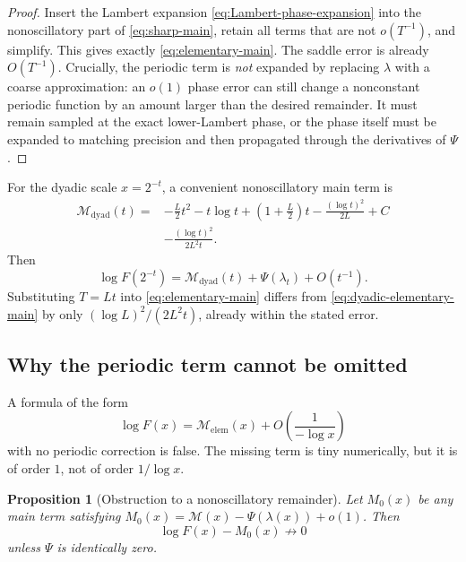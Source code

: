 \documentclass[11pt,oneside]{article}
\newtheorem{proposition}[theorem]{Proposition}
\theoremstyle{definition}
\theoremstyle{remark}
\newcommand{\Lam}{\lambda}
\newcommand{\Ltwo}{L}
\newcommand{\PsiPer}{\Psi}
\begin{document}
\begin{proof}
Insert the Lambert expansion \eqref{eq:Lambert-phase-expansion} into the
nonoscillatory part of \eqref{eq:sharp-main}, retain all terms that are not
$o(T^{-1})$, and simplify.  This gives exactly
\eqref{eq:elementary-main}.  The saddle error is already $O(T^{-1})$.
Crucially, the periodic term is \emph{not} expanded by replacing $\Lam$ with a
coarse approximation: an $o(1)$ phase error can still change a nonconstant
periodic function by an amount larger than the desired remainder.  It must remain
sampled at the exact lower-Lambert phase, or the phase itself must be expanded to
matching precision and then propagated through the derivatives of $\PsiPer$.
\end{proof}

For the dyadic scale $x=2^{-t}$, a convenient nonoscillatory main term is
\begin{equation}\label{eq:dyadic-elementary-main}
\begin{split}
 \mathcal M_{\mathrm{dyad}}(t)={}&
 -\frac{\Ltwo}{2}t^2-t\log t
 +\left(1+\frac{\Ltwo}{2}\right)t
 -\frac{(\log t)^2}{2\Ltwo}+C\\
 &-\frac{(\log t)^2}{2\Ltwo^2t}.
\end{split}
\end{equation}
Then
\begin{equation}\label{eq:dyadic-elementary-asymptotic}
  \log F(2^{-t})=\mathcal M_{\mathrm{dyad}}(t)
  +\PsiPer(\Lam_t)+O(t^{-1}).
\end{equation}
Substituting $T=\Ltwo t$ into \eqref{eq:elementary-main} differs from
\eqref{eq:dyadic-elementary-main} by only
$(\log\Ltwo)^2/(2\Ltwo^2t)$, already within the stated error.

\subsection{Why the periodic term cannot be omitted}

\begin{warningbox}
A formula of the form
\[
  \log F(x)=\mathcal M_{\mathrm{elem}}(x)
  +O\left(\frac1{-\log x}\right)
\]
with no periodic correction is false.  The missing term is tiny numerically, but it
is of order $1$, not of order $1/\log x$.
\end{warningbox}

\begin{proposition}[Obstruction to a nonoscillatory remainder]\label{prop:periodic-obstruction}
Let $M_0(x)$ be any main term satisfying
$M_0(x)=\mathcal M(x)-\PsiPer(\Lam(x))+o(1)$.  Then
\begin{equation}\label{eq:no-small-remainder}
  \log F(x)-M_0(x)\not\longrightarrow0
\end{equation}
unless $\PsiPer$ is identically zero.
\end{proposition}
\end{document}
